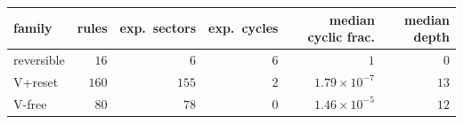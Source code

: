 \begin{tabular}{lrrrrr}
\hline
family & rules & exp.\ sectors & exp.\ cycles & median cyclic frac. & median depth \\
\hline
reversible & $16$ & $6$ & $6$ & $1$ & $0$ \\
V+reset & $160$ & $155$ & $2$ & $1.79\times10^{-7}$ & $13$ \\
V-free & $80$ & $78$ & $0$ & $1.46\times10^{-5}$ & $12$ \\
\hline
\end{tabular}
